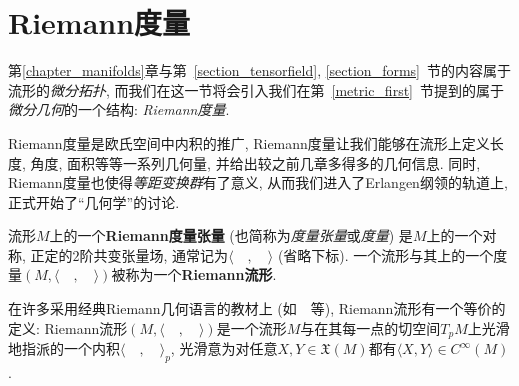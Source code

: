 \section{Riemann度量}
第\ref{chapter_manifolds}章与第~\ref{section_tensorfield}, \ref{section_forms}~节的内容属于流形的\textit{微分拓扑}, 而我们在这一节将会引入我们在第~\ref{metric_first}~节提到的属于\textit{微分几何}的一个结构: \textit{Riemann度量}.

Riemann度量是欧氏空间中内积的推广, Riemann度量让我们能够在流形上定义长度, 角度, 面积等等一系列几何量, 并给出较之前几章多得多的几何信息.
同时, Riemann度量也使得\textit{等距变换群}有了意义, 从而我们进入了Erlangen纲领的轨道上, 正式开始了``几何学''的讨论.

\begin{defn}
    流形$M$上的一个\textbf{Riemann度量张量} (也简称为\textit{度量张量}或\textit{度量}) 是$M$上的一个对称, 正定的$2$阶共变张量场, 通常记为$\langle\quad,\quad\rangle$ (省略下标).
    一个流形与其上的一个度量$(M,\langle\quad,\quad\rangle)$被称为一个\textbf{Riemann流形}.
\end{defn}

\begin{rem}
    在许多采用经典Riemann几何语言的教材上 (如~\parencites{doCarmo_DiffForm}{Tu_DiffGeo}~等), Riemann流形有一个等价的定义:
    Riemann流形$(M,\langle\quad,\quad\rangle)$是一个流形$M$与在其每一点的切空间$T_pM$上光滑地指派的一个内积$\langle\quad,\quad\rangle_p$, 光滑意为对任意$X,Y\in\mathfrak{X}(M)$都有$\langle X,Y\rangle\in C^\infty(M)$.
\end{rem}

